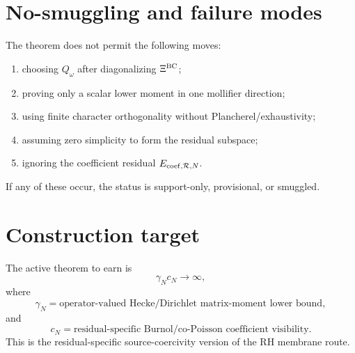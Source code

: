 \documentclass[11pt]{article}
\begin{document}
\section{No-smuggling and failure modes}
The theorem does not permit the following moves:
\begin{enumerate}[label=(\roman*)]
\item choosing $Q_\omega$ after diagonalizing $\Xi^{\rm BC}$;
\item proving only a scalar lower moment in one mollifier direction;
\item using finite character orthogonality without Plancherel/exhaustivity;
\item assuming zero simplicity to form the residual subspace;
\item ignoring the coefficient residual $E_{{\rm coef},\mathcal R,N}$.
\end{enumerate}
If any of these occur, the status is support-only, provisional, or smuggled.

\section{Construction target}
The active theorem to earn is
\[
  \gamma_Nc_N\to\infty,
\]
where
\[
  \gamma_N
  =\text{operator-valued Hecke/Dirichlet matrix-moment lower bound},
\]
and
\[
  c_N
  =\text{residual-specific Burnol/co-Poisson coefficient visibility}.
\]
This is the residual-specific source-coercivity version of the RH membrane route.
\end{document}
